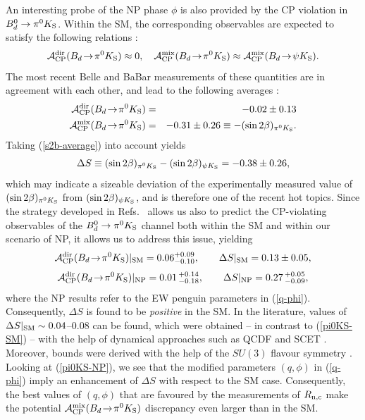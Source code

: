 \documentclass[12pt]{article}
\begin{document}
An interesting probe of the NP phase $\phi$ is also provided
by the CP violation in  $B^0_d\to\pi^0 K_{\rm S}$. Within the SM,
the corresponding observables are expected to satisfy the following 
relations \cite{PAPIII}:
\begin{equation}\label{Bdpi0K0-rel}
{\cal A}_{\rm CP}^{\rm dir}(B_d\!\to\!\pi^0 K_{\rm S})\approx 0, \quad
{\cal A}_{\rm CP}^{\rm mix}(B_d\!\to\!\pi^0 K_{\rm S})\approx
{\cal A}_{\rm CP}^{\rm mix}(B_d\!\to\!\psi K_{\rm S}).
\end{equation}
The most recent  Belle \cite{Belle-Bphi-K} and BaBar \cite{BaBar-pi0KS}
measurements of these quantities are in agreement with each other, and 
lead to the following averages \cite{HFAG}:
\begin{eqnarray}
{\cal A}_{\rm CP}^{\rm dir}(B_d\!\to\!\pi^0 K_{\rm S})&=&-0.02\pm0.13\\
{\cal A}_{\rm CP}^{\rm mix}(B_d\!\to\!\pi^0 K_{\rm S})&=&-0.31\pm0.26
\equiv -(\sin2\beta)_{\pi^0K_{\rm S}}.
\end{eqnarray}
Taking (\ref{s2b-average}) into account yields
\begin{equation}\label{DS}
\Delta S \equiv (\sin2\beta)_{\pi^0K_{\rm S}}-
(\sin2\beta)_{\psi K_{\rm S}} =%
-0.38\pm 0.26,
\end{equation}
which may indicate a sizeable deviation of the
experimentally measured value of $(\sin2\beta)_{\pi^0K_{\rm S}}$ from
$(\sin2\beta)_{\psi K_{\rm S}}$, and is therefore one of the recent hot topics. 
Since the strategy developed in Refs.~\cite{BFRS2,BFRS3} allows us also to predict the 
CP-violating observables of the $B^0_d\to\pi^0 K_{\rm S}$ channel both within the 
SM and within our scenario of NP, it allows us to address this issue, yielding
\begin{equation}\label{pi0KS-SM}
{\cal A}_{\rm CP}^{\rm dir}(B_d\!\to\!\pi^0 K_{\rm S})|_{\rm SM}=0.06^{+0.09}_{-0.10},
\qquad
\Delta S\vert_{\rm SM}= 0.13\pm0.05, 
\end{equation}
\begin{equation}\label{pi0KS-NP}
{\cal A}_{\rm CP}^{\rm dir}(B_d\!\to\!\pi^0 K_{\rm S})|_{\rm NP}=0.01\,^{+0.14}_{-0.18}, 
\qquad \Delta S\vert_{\rm NP}=0.27\,^{+0.05}_{-0.09},
\end{equation}
where the NP results refer to the EW penguin parameters in (\ref{q-phi}). Consequently,
$\Delta S$ is found to be {\it positive} in the SM. In the literature, values of
$\Delta S\vert_{\rm SM}\sim0.04$--$0.08$ can be found, which were obtained
-- in contrast to (\ref{pi0KS-SM})  -- with the help of dynamical approaches such as QCDF \cite{beneke} and SCET \cite{SCET-Bdpi0K0}. Moreover, 
bounds were derived with the help of the $SU(3)$ flavour symmetry 
\cite{SU3-bounds}. Looking at (\ref{pi0KS-NP}), we see that the modified  
parameters $(q,\phi)$ in (\ref{q-phi}) imply an enhancement of $\Delta S$ with 
respect to the SM case. Consequently, the best values of $(q,\phi)$ that are 
favoured by the measurements of $R_{\rm n,c}$ make the potential 
${\cal A}_{\rm CP}^{\rm mix}(B_d\!\to\!\pi^0 K_{\rm S})$ discrepancy 
even larger than in the SM. 
\end{document}
